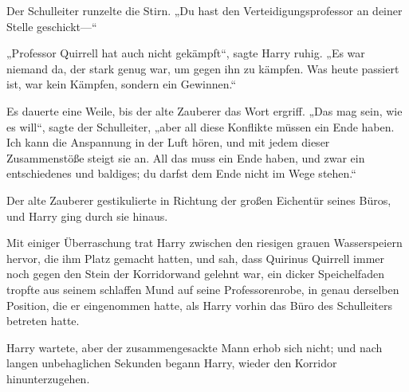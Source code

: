 Der Schulleiter runzelte die Stirn.
„Du hast den Verteidigungsprofessor an deiner Stelle geschickt—“

„Professor Quirrell hat auch nicht gekämpft“, sagte Harry ruhig.
„Es war niemand da, der stark genug war, um gegen ihn zu kämpfen. Was heute passiert ist, war kein Kämpfen, sondern ein Gewinnen.“

Es dauerte eine Weile, bis der alte Zauberer das Wort ergriff.
„Das mag sein, wie es will“, sagte der Schulleiter, „aber all diese Konflikte müssen ein Ende haben. Ich kann die Anspannung in der Luft hören, und mit jedem dieser Zusammenstöße steigt sie an. All das muss ein Ende haben, und zwar ein entschiedenes und baldiges; du darfst dem Ende nicht im Wege stehen.“

Der alte Zauberer gestikulierte in Richtung der großen Eichentür seines Büros, und Harry ging durch sie hinaus.

\later

Mit einiger Überraschung trat Harry zwischen den riesigen grauen Wasserspeiern hervor, die ihm Platz gemacht hatten, und sah, dass Quirinus Quirrell immer noch gegen den Stein der Korridorwand gelehnt war, ein dicker Speichelfaden tropfte aus seinem schlaffen Mund auf seine Professorenrobe, in genau derselben Position, die er eingenommen hatte, als Harry vorhin das Büro des Schulleiters betreten hatte.

Harry wartete, aber der zusammengesackte Mann erhob sich nicht; und nach langen unbehaglichen Sekunden begann Harry, wieder den Korridor hinunterzugehen.

